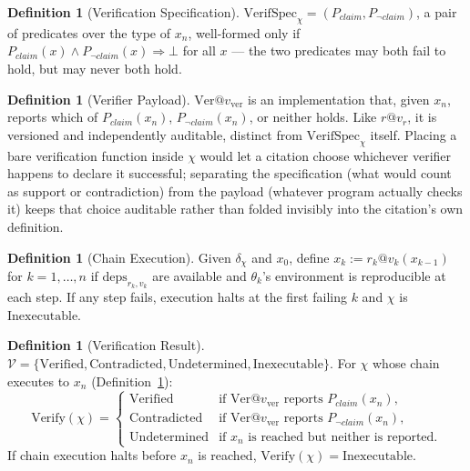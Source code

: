 \documentclass[11pt]{article}
\theoremstyle{definition}
\newtheorem{definition}[theorem]{Definition}
\begin{document}
\begin{definition}[Verification Specification]
\label{def:verifspec}
$\mathrm{VerifSpec}_\chi = (P_{\mathit{claim}}, P_{\neg\mathit{claim}})$, a pair of predicates over the type of $x_n$, well-formed only if $P_{\mathit{claim}}(x) \wedge P_{\neg\mathit{claim}}(x) \Rightarrow \bot$ for all $x$ --- the two predicates may both fail to hold, but may never both hold.
\end{definition}

\begin{definition}[Verifier Payload]
\label{def:verifier-payload}
$\mathrm{Ver}@v_{\mathrm{ver}}$ is an implementation that, given $x_n$, reports which of $P_{\mathit{claim}}(x_n)$, $P_{\neg\mathit{claim}}(x_n)$, or neither holds. Like $r@v_r$, it is versioned and independently auditable, distinct from $\mathrm{VerifSpec}_\chi$ itself. Placing a bare verification function inside $\chi$ would let a citation choose whichever verifier happens to declare it successful; separating the specification (what would count as support or contradiction) from the payload (whatever program actually checks it) keeps that choice auditable rather than folded invisibly into the citation's own definition.
\end{definition}

\begin{definition}[Chain Execution]
\label{def:chain-execution}
Given $\delta_\chi$ and $x_0$, define $x_k := r_k@v_k(x_{k-1})$ for $k=1,\ldots,n$ if $\mathrm{deps}_{r_k,v_k}$ are available and $\theta_k$'s environment is reproducible at each step. If any step fails, execution halts at the first failing $k$ and $\chi$ is $\mathrm{Inexecutable}$.
\end{definition}

\begin{definition}[Verification Result]
\label{def:verification-result}
$\mathcal{V} = \{\mathrm{Verified}, \mathrm{Contradicted}, \mathrm{Undetermined}, \mathrm{Inexecutable}\}$. For $\chi$ whose chain executes to $x_n$ (Definition~\ref{def:chain-execution}):
\[
\mathrm{Verify}(\chi) =
\begin{cases}
\mathrm{Verified} & \text{if } \mathrm{Ver}@v_{\mathrm{ver}} \text{ reports } P_{\mathit{claim}}(x_n), \\
\mathrm{Contradicted} & \text{if } \mathrm{Ver}@v_{\mathrm{ver}} \text{ reports } P_{\neg\mathit{claim}}(x_n), \\
\mathrm{Undetermined} & \text{if } x_n \text{ is reached but neither is reported.}
\end{cases}
\]
If chain execution halts before $x_n$ is reached, $\mathrm{Verify}(\chi) = \mathrm{Inexecutable}$.
\end{definition}
\end{document}
